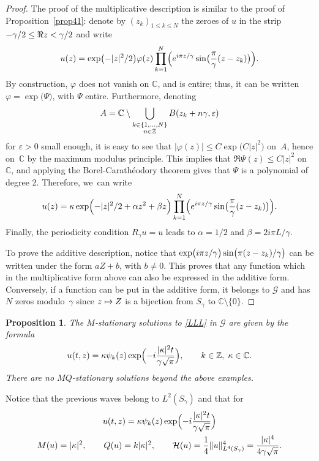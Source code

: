 \documentclass[JEP,XML,SOM,Unicode,NoFloatCountersInSection,published]{cedram}
\newcommand\mto{\mathchoice{\longmapsto}{\mapsto}{\mapsto}{\mapsto}}
\newtheorem{prop}[theorem]{Proposition}
\theoremstyle{definition}
\let\eps\varepsilon
\let\EE\exp
\let\dis\relax
\newcommand\C{\mathbb C}
\newcommand\Z{\mathbb Z}
\begin{document}
\begin{proof}
The proof of the multiplicative description is similar to the proof of Proposition~\ref{prop41}: denote by $(z_k)_{1\leq k\leq N}$ the zeroes of $u$ in the strip $\dis -\gamma/2\leq \Re z< \gamma/2$ and write\vspace*{-3pt}
\[
\dis u(z) = \EE\bigl(-|z|^2/2\bigr) \varphi(z) \prod_{k=1}^N\Bigl(e^{{i\pi z }/{\gamma}}\sin\bigl(\frac{\pi}{\gamma}(z-z_k)\bigr)\Bigr).
\]
By construction, $\varphi$ does not vanish on $\mathbb{C}$, and is entire; thus, it can be written $\varphi = \EE\bigl(\Psi\bigr)$, with $\Psi$ entire. Furthermore, denoting
\[
\dis A = \mathbb{C} \setminus \bigcup_{\substack{k \in\{1,\dots,N\} \\ n \in \mathbb{Z}}} B(z_k+n\gamma,\eps)
\]
for $\eps>0$ small enough, it is easy to see that $|\varphi(z)| \leq C \EE\bigl(C|z|^2\bigr)$ on~$A$, hence on~$\mathbb{C}$ by the maximum modulus principle. This implies that $\Re \Psi (z) \leq C |z|^2$ on $\mathbb{C}$, and applying the Borel-Carathéodory theorem gives that $\Psi$ is a polynomial of degree 2. Therefore, we~can write\vspace*{-3pt}
\[
u(z) = \kappa \EE\Bigl({-|z|^2/2 + \alpha z^2 + \beta z}\Bigr) \prod_{k=1}^N\Bigl(e^{{i\pi z}/ {\gamma} }\sin\bigl(\frac{\pi}{\gamma}(z-z_k)\bigr)\Bigr).
\]
Finally, the periodicity condition $R_\gamma u = u$ leads to $\alpha = {1}/2$ and $\beta = {2i\pi L}/{\gamma}$.

To prove the additive description, notice that $\dis \EE\bigl({{i\pi z}/{\gamma} }\bigr)\sin\bigl({\pi}(z-z_k)/\gamma\bigr)$ can be written under the form $aZ+b$, with $b \neq 0$. This proves that any function which in the multiplicative form above can also be expressed in the additive form. Conversely, if a function can be put in the additive form, it belongs to $\mathcal{G}$ and has $N$ zeros modulo~$\gamma$ since $z \mto Z$ is a bijection from $S_\gamma$ to $\mathbb{C} \setminus\{ 0 \}$.
\end{proof}

\begin{prop}
The $M$-stationary solutions to \eqref{LLL} in $\mathcal{G}$ are given by the formula\vspace*{-3pt}
\[
u(t,z)=\kappa \psi_k(z) \EE\Bigl(-i \frac{|\kappa|^2 t }{\gamma\sqrt{\pi}}\Bigr), \quad\quad k \in \Z, \; \kappa \in \C.
\]
There are no $MQ$-stationary solutions beyond the above examples.
\end{prop}

Notice that the previous waves belong to $L^2(S_{\gamma})$ and that for
\begin{gather*}
u(t,z)=\kappa \psi_k(z) \EE\Bigl(-i \frac{|\kappa|^2 t }{\gamma\sqrt{\pi}}\Bigr)
\\
M(u)=|\kappa|^2, \qquad Q(u)=k|\kappa|^2, \qquad \mathcal{H}(u)=\frac14 \|u\|^4_{L^4(S_{\gamma})}=\frac{|\kappa|^4}{4\gamma\sqrt{\pi}}.
\end{gather*}
\end{document}
